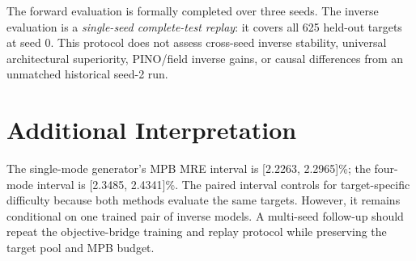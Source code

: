 The forward evaluation is formally completed over three seeds. The inverse
evaluation is a \emph{single-seed complete-test replay}: it covers all 625
held-out targets at seed 0. This protocol does not assess cross-seed inverse
stability, universal architectural superiority, PINO/field inverse gains, or
causal differences from an unmatched historical seed-2 run.

\section{Additional Interpretation}

The single-mode generator's MPB MRE interval is [2.2263, 2.2965]\%; the
four-mode interval is [2.3485, 2.4341]\%. The paired interval controls for
target-specific difficulty because both methods evaluate the same targets.
However, it remains conditional on one trained pair of inverse models. A
multi-seed follow-up should repeat the objective-bridge training and replay
protocol while preserving the target pool and MPB budget.
